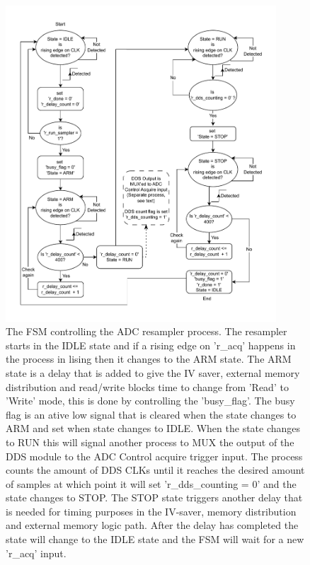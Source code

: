 \begin{figure}[H]
    \centering
    \includegraphics[clip, trim=0 0 0 0, width=0.9\textwidth]{Sections/7_SystemDesign/Figures/7_2_10_ADCResampler_FSM.pdf}
    \caption{The FSM controlling the ADC resampler process. The resampler starts in the IDLE state and if a rising edge on 'r\_acq' happens in the process in lising  then it changes to the ARM state. The ARM state is a delay that is added to give the IV saver, external memory distribution and read/write blocks time to change from 'Read' to 'Write' mode, this is done by controlling the 'busy\_flag'. The busy flag is an ative low signal that is cleared when the state changes to ARM and set when state changes to IDLE. When the state changes to RUN this will signal another process to MUX the output of the DDS module to the ADC Control acquire trigger input. The process counts the amount of DDS CLKs until it reaches the desired amount of samples at which point it will set 'r\_dds\_counting = 0' and the state changes to STOP. The STOP state triggers another delay that is needed for timing purposes in the IV-saver, memory distribution and external memory logic path. After the delay has completed the state will change to the IDLE state and the FSM will wait for a new 'r\_acq' input.}
    \label{fig:7_2_10_RESAMPLE_FSM}
\end{figure}

